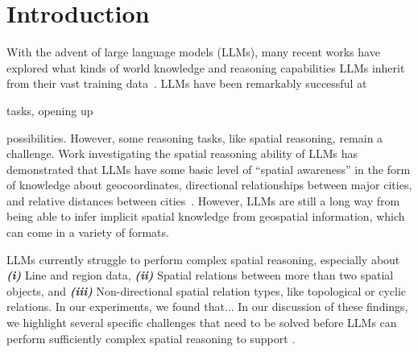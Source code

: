 \section{Introduction}

\label{section:introduction}

With the advent of large language models (LLMs), many recent works have explored what kinds of world knowledge and reasoning capabilities LLMs inherit from their vast training data~\cite{Mai2023, Bhandari2023, Qi2023}.
%
LLMs have been remarkably successful at 

tasks, opening up 


possibilities.
%
However, some reasoning tasks, like spatial reasoning, remain a challenge.
%
%
Work investigating the spatial reasoning ability of LLMs has demonstrated that LLMs have some basic level of ``spatial awareness'' in the form of knowledge about geocoordinates, directional relationships between major cities, and relative distances between cities~\cite{Bhandari2023, Qi2023}.
However, LLMs are still a long way from being able to infer implicit spatial knowledge from geospatial information, which can come in a variety of formats.


LLMs currently struggle to perform complex spatial reasoning, especially about
%
\textit{\textbf{(i)}} Line and region data,
\textit{\textbf{(ii)}} Spatial relations between more than two spatial objects, and 
\textit{\textbf{(iii)}} Non-directional spatial relation types, like topological or cyclic relations.
%
In our experiments, we found that... 
%
%
In our discussion of these findings, we highlight several specific challenges that need to be solved before LLMs can perform sufficiently complex spatial reasoning to support .


